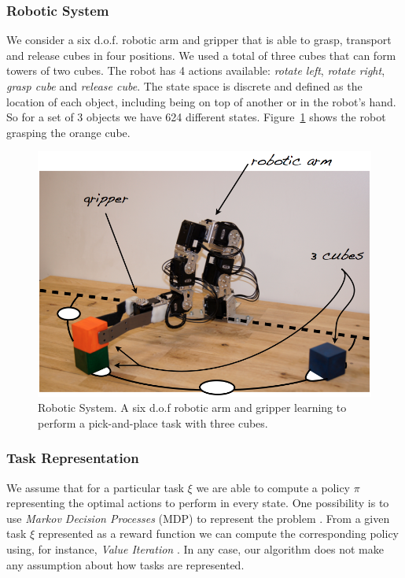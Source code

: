 \subsubsection{Robotic System}
\label{sec:RoboticSystem}
%
We consider a six d.o.f. robotic arm and gripper that is able to grasp, transport and release cubes in four positions. We used a total of three cubes that can form towers of two cubes.  The robot has 4 actions available: \textit{rotate left}, \textit{rotate right}, \textit{grasp cube} and \textit{release cube}. The state space is discrete and defined as the location of each object, including being on top of another or in the robot's hand. So for a set of 3 objects we have 624 different states. Figure~\ref{setup} shows the robot grasping the orange cube. 
%
\begin{figure}[!htbp]
	\centering
		\includegraphics[width=0.8\columnwidth]{images/setup4.png}
	\caption{Robotic System. A six d.o.f robotic arm and gripper learning to perform a pick-and-place task with three cubes.
	        }
	\label{setup}
\end{figure}
%
\subsubsection{Task Representation}
\label{sec:TaskRepresentation}
%
We assume that for a particular task $\xi$ we are able to compute a policy $\pi$ representing the optimal actions to perform in every state. One possibility is to use \textit{Markov Decision Processes} (MDP) to represent the problem \cite{sutton1998reinforcement}. From a given task $\xi$ represented as a reward function we can compute the corresponding policy using, for instance, \textit{Value Iteration} \cite{sutton1998reinforcement}. In any case, our algorithm does not make any assumption about how tasks are represented.

